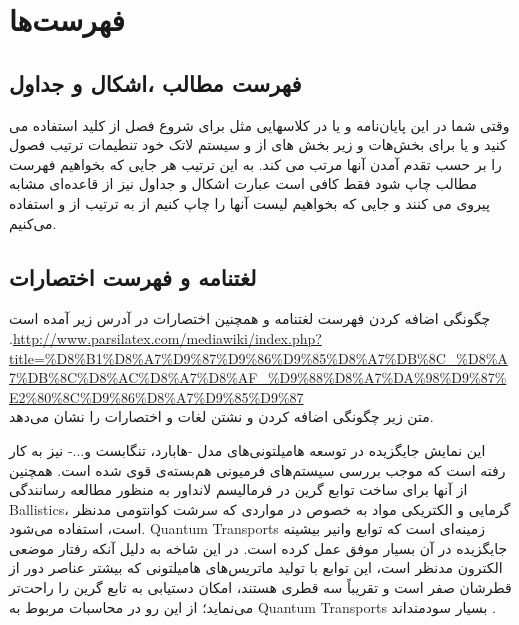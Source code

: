 \chapter{فهرست‌ها}\label{chp:chap5}
\thispagestyle{empty}
\rhead{\leftmark}
\section{فهرست مطالب ،اشکال و جداول}
وقتی شما در این پایان‌نامه و یا در کلاسهایی مثل  برای شروع فصل از کلید 
استفاده می کنید و یا برای بخش‌هات و زیر بخش های از 
و
سیستم لاتک خود تنطیمات ترتیب فصول را بر حسب تقدم آمدن آنها مرتب می کند. به این ترتیب هر جایی که بخواهیم فهرست مطالب چاپ شود فقط کافی است عبارت 
  اشکال و جداول نیز از قاعده‌ای مشابه پیروی می کنند و جایی که بخواهیم لیست آنها را چاپ کنیم از به ترتیب از 
  و
استفاده می‌کنیم.
\section{ لغتنامه و فهرست اختصارات}\label{seq:5.2}
چگونگی اضافه کردن فهرست لغتنامه و همچنین اختصارات در آدرس زیر آمده است\\.\url{http://www.parsilatex.com/mediawiki/index.php?title=\%D8\%B1\%D8\%A7\%D9\%87\%D9\%86\%D9\%85\%D8\%A7\%DB\%8C\_\%D8\%A7\%DB\%8C\%D8\%AC\%D8\%A7\%D8\%AF\_\%D9\%88\%D8\%A7\%DA\%98\%D9\%87\%E2\%80\%8C\%D9\%86\%D8\%A7\%D9\%85\%D9\%87} \\
متن زیر چگونگی اضافه کردن و نشتن لغات و اختصارات را نشان می‌دهد.

این نمایش جایگزیده در توسعه هامیلتونی‌های مدل -هابارد، تنگابست و...- نیز به کار رفته است که موجب بررسی سیستم‌های فرمیونی هم‌بسته‌ی قوی شده است\cite{Schnell2002}. همچنین از آنها برای ساخت توابع گرین در فرمالیسم لانداور به منظور مطالعه رسانندگی \glspl{Ballistic}\cite{Calzolari2004}، گرمایی\cite{Paul2003} و الکتریکی\cite{Lopez-Bezanilla2009} مواد به خصوص در مواردی که سرشت کوانتومی مدنظر است، استفاده می‌شود\cite{Lee2005}.
\glspl{Quantum Transport}
زمینه‌ای است که توابع وانیر بیشینه جایگزیده در آن بسیار موفق عمل کرده است. در این شاخه به دلیل آنکه رفتار موضعی الکترون مدنظر است، این توابع با تولید ماتریس‌های هامیلتونی که بیشتر عناصر دور از قطرشان صفر است و تقریباً سه قطری هستند، امکان دستیابی به تابع گرین را راحت‌تر می‌نماید؛ از این رو در محاسبات مربوط به \glspl{Quantum Transport} بسیار سودمنداند
\cite{Kim2013}.


